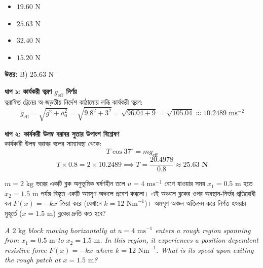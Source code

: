 \documentclass[12pt, a4paper]{article}
\begin{document}
{%
\begin{itemize}[label={}, leftmargin=1cm, itemsep=0.5em]
\item[\textbf{A)}] $19.60\text{ N}$
\item[\textbf{B)}] $25.63\text{ N}$
\item[\textbf{C)}] $32.40\text{ N}$
\item[\textbf{D)}] $15.20\text{ N}$
\end{itemize}
\vspace{0.5em}

\begin{tcolorbox}[answerbox]
\textbf{\color{success} উত্তর:} B) $25.63\text{ N}$
\end{tcolorbox}
\vspace{1em}

\begin{tcolorbox}[solutionbox={সমাধান (Solution)}]
\noindent
\textbf{ধাপ ১: কার্যকরী ত্বরণ $g_{\text{eff}}$ নির্ণয়} \\
ত্বরান্বিত ট্রেনের অ-জড়তীয় নির্দেশ কাঠামোয় লব্ধি কার্যকরী ত্বরণ:
\[g_{\text{eff}} = \sqrt{g^2 + a_0^2} = \sqrt{9.8^2 + 3^2} = \sqrt{96.04 + 9} = \sqrt{105.04} \approx 10.2489\text{ ms}^{-2}\]

\vspace{0.5em}
\noindent\textbf{ধাপ ২: কার্যকরী উলম্ব বরাবর সুতার উপাংশ বিশ্লেষণ} \\
কার্যকারী উলম্ব বরাবর বলের সাম্যাবস্থা থেকে:
\[T \cos 37^\circ = m g_{\text{eff}}\]
\[T \times 0.8 = 2 \times 10.2489 \implies T = \frac{20.4978}{0.8} \approx \mathbf{25.63\text{ N}}\]
\end{tcolorbox}

\vspace{2em}

\begin{tcolorbox}[questionbox={প্রশ্ন (Question) 14}]
\noindent
$m = 2\text{ kg}$ ভরের একটি ব্লক অনুভূমিক ঘর্ষণহীন তলে $u = 4\text{ ms}^{-1}$ বেগে যাওয়ার সময় $x_1 = 0.5\text{ m}$ হতে $x_2 = 1.5\text{ m}$ পর্যন্ত বিস্তৃত একটি অমসৃণ অঞ্চলে প্রবেশ করলো। এই অঞ্চলে ব্লকের ওপর অবস্থান-নির্ভর প্রতিরোধী বল $F(x) = -kx$ ক্রিয়া করে (যেখানে $k = 12\text{ Nm}^{-1}$)। অমসৃণ অঞ্চল অতিক্রম করে নির্গত হওয়ার মুহূর্তে ($x = 1.5\text{ m}$) ব্লকের দ্রুতি কত হবে?
\vspace{0.8em}
\begin{english}
\noindent\textit{\color{darkgray}
A $2\text{ kg}$ block moving horizontally at $u = 4\text{ ms}^{-1}$ enters a rough region spanning from $x_1 = 0.5\text{ m}$ to $x_2 = 1.5\text{ m}$. In this region, it experiences a position-dependent resistive force $F(x) = -kx$ where $k = 12\text{ Nm}^{-1}$. What is its speed upon exiting the rough patch at $x = 1.5\text{ m}$?
}
\end{english}
\end{tcolorbox}

}
\end{document}
